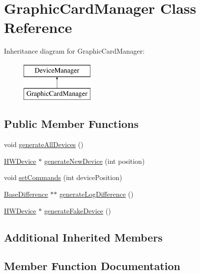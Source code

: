 \hypertarget{classGraphicCardManager}{}\section{Graphic\+Card\+Manager Class Reference}
\label{classGraphicCardManager}
Inheritance diagram for Graphic\+Card\+Manager\+:\begin{figure}[H]
\begin{center}
\leavevmode
\includegraphics[height=2.000000cm]{classGraphicCardManager}
\end{center}
\end{figure}
\subsection*{Public Member Functions}
\begin{DoxyCompactItemize}
\item 
void \hyperlink{classGraphicCardManager_a6c94b17b01bd0f27bf0822c269d1c41c}{generate\+All\+Devices} ()
\item 
\hyperlink{classHWDevice}{H\+W\+Device} $\ast$ \hyperlink{classGraphicCardManager_a1835a9054bccb574e74dc2ebb2c28554}{generate\+New\+Device} (int position)
\item 
void \hyperlink{classGraphicCardManager_a42bc616062f94b2e4ee92a79ba537a16}{set\+Commands} (int device\+Position)
\item 
\hyperlink{classBaseDifference}{Base\+Difference} $\ast$$\ast$ \hyperlink{classGraphicCardManager_a17d988dac37f04cb1dddd45eef8c3aea}{generate\+Log\+Difference} ()
\item 
\hyperlink{classHWDevice}{H\+W\+Device} $\ast$ \hyperlink{classGraphicCardManager_ac71590c819520e60a491c8e69252efe1}{generate\+Fake\+Device} ()
\end{DoxyCompactItemize}
\subsection*{Additional Inherited Members}


\subsection{Member Function Documentation}
